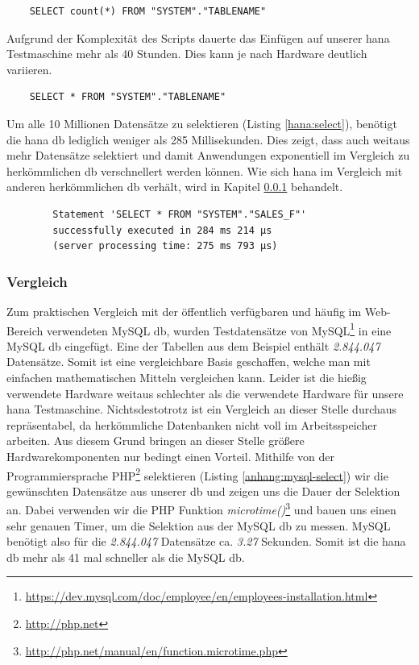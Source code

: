 \begin{lstlisting}
	SELECT count(*) FROM "SYSTEM"."TABLENAME"
\end{lstlisting}

Aufgrund der Komplexität des Scripts dauerte das Einfügen auf unserer \gls{hana} Testmaschine mehr als 40 Stunden. Dies kann je nach Hardware deutlich variieren.\\

\begin{lstlisting}
	SELECT * FROM "SYSTEM"."TABLENAME"
\end{lstlisting}

Um alle 10 Millionen Datensätze zu selektieren (Listing \ref{hana:select}), benötigt die \gls{hana} \gls{db} lediglich weniger als 285 Millisekunden. Dies zeigt, dass auch weitaus mehr Datensätze selektiert und damit Anwendungen exponentiell im Vergleich zu herkömmlichen \gls{db} verschnellert werden können. Wie sich \gls{hana} im Vergleich mit anderen herkömmlichen \gls{db} verhält, wird in Kapitel \ref{sec:db-hana-vgl} behandelt.

\begin{center}
	\begin{verbatim}
		Statement 'SELECT * FROM "SYSTEM"."SALES_F"' 
		successfully executed in 284 ms 214 µs  
		(server processing time: 275 ms 793 µs)
	\end{verbatim}
\end{center}

\subsubsection{Vergleich}
\label{sec:db-hana-vgl}
Zum praktischen Vergleich mit der öffentlich verfügbaren und häufig im Web-Bereich verwendeten MySQL \gls{db}, wurden Testdatensätze von MySQL\footnote{\url{https://dev.mysql.com/doc/employee/en/employees-installation.html}} in eine MySQL \gls{db} eingefügt. Eine der Tabellen aus dem Beispiel enthält \emph{2.844.047} Datensätze. Somit ist eine vergleichbare Basis geschaffen, welche man mit einfachen mathematischen Mitteln vergleichen kann. Leider ist die hießig verwendete Hardware weitaus schlechter als die verwendete Hardware für unsere \gls{hana} Testmaschine. Nichtsdestotrotz ist ein Vergleich an dieser Stelle durchaus repräsentabel, da herkömmliche Datenbanken nicht voll im Arbeitsspeicher arbeiten. Aus diesem Grund bringen an dieser Stelle größere Hardwarekomponenten nur bedingt einen Vorteil.
Mithilfe von der Programmiersprache PHP\footnote{\url{http://php.net}} selektieren (Listing \ref{anhang:mysql-select}) wir die gewünschten Datensätze aus unserer \gls{db} und zeigen uns die Dauer der Selektion an. Dabei verwenden wir die PHP Funktion \emph{microtime()}\footnote{\url{http://php.net/manual/en/function.microtime.php}} und bauen uns einen sehr genauen Timer, um die Selektion aus der MySQL \gls{db} zu messen.
MySQL benötigt also für die \emph{2.844.047} Datensätze ca. \emph{3.27} Sekunden. Somit ist die \gls{hana} \gls{db} mehr als 41 mal schneller als die MySQL \gls{db}. 

